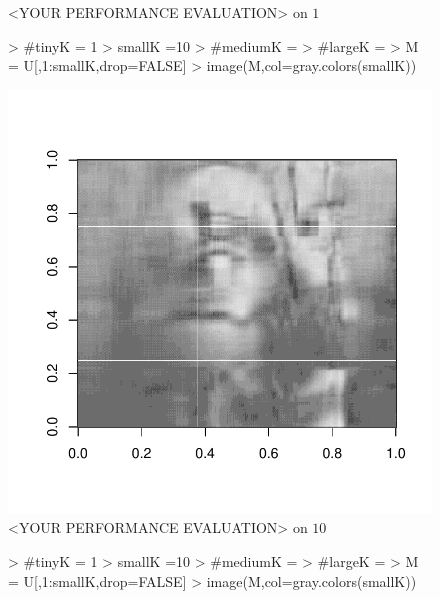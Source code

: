 \documentclass[12pt]{article}
\begin{document}
\begin{itemize}
\begin{itemize}
\begin{itemize}
\begin{figure}
\caption{<YOUR PERFORMANCE EVALUATION> on $1$}
    \label{fig:matlabclownKaNumber}
\end{figure}
\begin{figure}
    \centering
\begin{Schunk}
\begin{Sinput}
> #tinyK = 1
> smallK =10 
> #mediumK = 
> #largeK = 
> M = U[,1:smallK,drop=FALSE] %
> image(M,col=gray.colors(smallK))
\end{Sinput}
\end{Schunk}
\includegraphics{nhleeHW3-009}
\caption{<YOUR PERFORMANCE EVALUATION> on $10$}
    \label{fig:matlabclownKaNumber}
\end{figure}
\begin{figure}
    \centering
\begin{Schunk}
\begin{Sinput}
> #tinyK = 1
> smallK =10 
> #mediumK = 
> #largeK = 
> M = U[,1:smallK,drop=FALSE] %
> image(M,col=gray.colors(smallK))
\end{Sinput}
\end{Schunk}

\end{figure}
\end{itemize}
\end{itemize}
\end{itemize}
\end{document}
